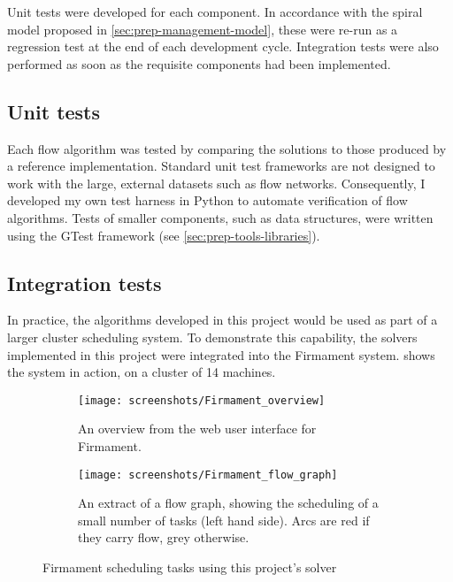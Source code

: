 

Unit tests were developed for each component. In accordance with the spiral model proposed in \cref{sec:prep-management-model}, these were re-run as a regression test at the end of each development cycle. Integration tests were also performed as soon as the requisite components had been implemented.

\subsection{Unit tests} \label{sec:eval-testing-unit}

Each flow algorithm was tested by comparing the solutions to those produced by a reference implementation. Standard unit test frameworks are not designed to work with the large, external datasets such as flow networks. Consequently, I developed my own test harness in Python to automate verification of flow algorithms. Tests of smaller components, such as data structures, were written using the GTest framework (see \cref{sec:prep-tools-libraries}).

\subsection{Integration tests} \label{sec:eval-test-integration}

In practice, the algorithms developed in this project would be used as part of a larger cluster scheduling system. To demonstrate this capability, the solvers implemented in this project were integrated into the Firmament system.  shows the system in action, on a cluster of 14 machines.

\begin{figure}
    \begin{subfigure}{\textwidth}
        \texttt{[image: screenshots/Firmament\_overview]}
        \caption{An overview from the web user interface for Firmament.}
    \end{subfigure}
    \begin{subfigure}{\textwidth}
        \texttt{[image: screenshots/Firmament\_flow\_graph]}
        \caption{An extract of a flow graph, showing the scheduling of a small number of tasks (left hand side). Arcs are {\color{red} red} if they carry flow, {\color{gray} grey} otherwise.}
    \end{subfigure}
    \caption{Firmament scheduling tasks using this project's solver}
    \label{fig:firmament-ui}
\end{figure}

